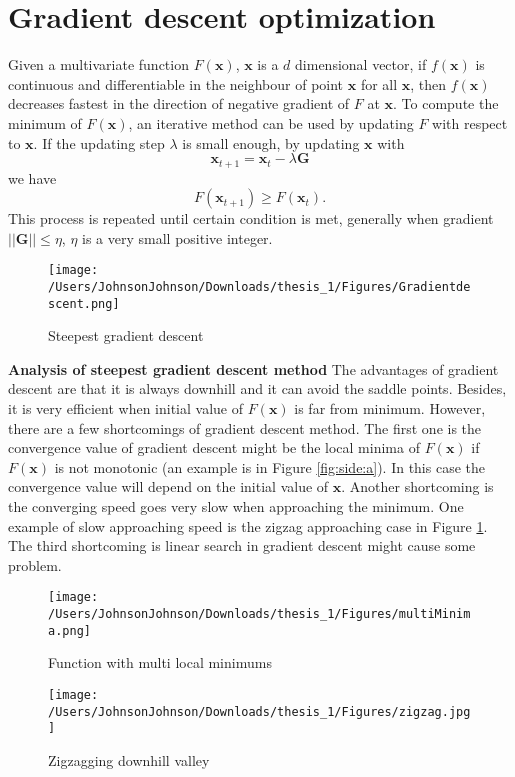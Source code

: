  \section{Gradient descent optimization}
 Given a multivariate function $F(\bm{x})$, $\bm{x}$ is a $d$ dimensional vector, if $f(\bm{x})$ is continuous and differentiable in the neighbour of point $\bm{x}$ for all $\bm{x}$, then $f(\bm{x})$ decreases fastest in the direction of negative gradient of $F$ at $\bm{x}$. To compute the minimum of $F(\bm{x})$, an iterative method can be used by updating $F$ with respect to $\bm{x}$. If the updating step $\lambda$ is small enough, by updating $\bm{x}$ with 
 \begin{equation}
 \bm{x}_{t+1} = \bm{x}_{t} - \lambda \bm{G}
 \end{equation}
we have 
  \begin{equation}
 F(\bm{x}_{t+1}) \ge F(\bm{x}_t).
  \end{equation}
This process is repeated until certain condition is met, generally when gradient $||\bm{G}|| \le \eta$, $\eta$ is a very small positive integer. 
\begin{figure}
\centering
\texttt{[image: /Users/JohnsonJohnson/Downloads/thesis\_1/Figures/Gradientdescent.png]}
\caption{Steepest gradient descent}
\vspace{0em}
\end{figure} 

\textbf{Analysis of steepest gradient descent method} The advantages of gradient descent are that it is always downhill and it can avoid the saddle points. Besides, it is very efficient when initial value of $F(\bm{x})$ is far from minimum. However, there are a few shortcomings of gradient descent method. The first one is the convergence value of gradient descent might be the local minima of $F(\bm{x})$ if $F(\bm{x})$ is not monotonic (an example is in Figure \ref{fig:side:a}). In this case the convergence value will depend on the initial value of $\bm{x}$. Another shortcoming is the converging speed goes very slow when approaching the minimum. One example of slow approaching speed is the zigzag approaching case in Figure \ref{fig:side:b}. The third shortcoming is linear search in gradient descent might cause some problem.
\begin{figure}[H]
\begin{minipage}[t]{0.5\linewidth}
\centering
\texttt{[image: /Users/JohnsonJohnson/Downloads/thesis\_1/Figures/multiMinima.png]}
\caption{Function with multi local minimums}
\label{fig:side:a}
\end{minipage}%
\begin{minipage}[t]{0.5\linewidth}
\centering
\texttt{[image: /Users/JohnsonJohnson/Downloads/thesis\_1/Figures/zigzag.jpg]}
\caption{Zigzagging downhill valley}
\label{fig:side:b}
\end{minipage}
\end{figure}

